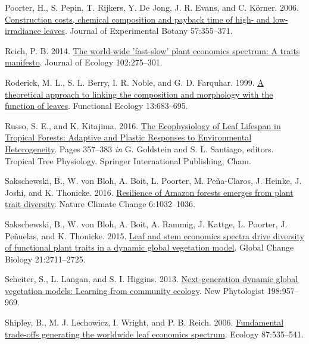 \documentclass[
  12pt,
  a4paper,
,tablecaptionabove
]{scrartcl}
\newlength{\cslhangindent}
\newenvironment{CSLReferences}[2] %
 {%
  \setlength{\parindent}{0pt}
  \ifodd #1 \everypar{\setlength{\hangindent}{\cslhangindent}}\ignorespaces\fi
  \ifnum #2 > 0
  \setlength{\parskip}{#2\baselineskip}
  \fi
 }%
 {}
\begin{document}
\begin{CSLReferences}{1}{0}
\leavevmode{}%
Poorter, H., S. Pepin, T. Rijkers, Y. De Jong, J. R. Evans, and C.
Körner. 2006. \href{https://doi.org/10.1093/jxb/erj002}{Construction
costs, chemical composition and payback time of high- and low-irradiance
leaves}. Journal of Experimental Botany 57:355--371.

\leavevmode{}%
Reich, P. B. 2014. \href{https://doi.org/10.1111/1365-2745.12211}{The
world-wide 'fast-slow' plant economics spectrum: {A} traits manifesto}.
Journal of Ecology 102:275--301.

\leavevmode{}%
Roderick, M. L., S. L. Berry, I. R. Noble, and G. D. Farquhar. 1999.
\href{https://doi.org/10.1046/j.1365-2435.1999.00368.x}{A theoretical
approach to linking the composition and morphology with the function of
leaves}. Functional Ecology 13:683--695.

\leavevmode{}%
Russo, S. E., and K. Kitajima. 2016.
\href{https://doi.org/10.1007/978-3-319-27422-5_17}{The {Ecophysiology}
of {Leaf Lifespan} in {Tropical Forests}: {Adaptive} and {Plastic
Responses} to {Environmental Heterogeneity}}. Pages 357--383 \emph{in}
G. Goldstein and S. L. Santiago, editors. Tropical {Tree Physiology}.
{Springer International Publishing}, {Cham}.

\leavevmode{}%
Sakschewski, B., W. von Bloh, A. Boit, L. Poorter, M. Peña-Claros, J.
Heinke, J. Joshi, and K. Thonicke. 2016.
\href{https://doi.org/10.1038/nclimate3109}{Resilience of {Amazon}
forests emerges from plant trait diversity}. Nature Climate Change
6:1032--1036.

\leavevmode{}%
Sakschewski, B., W. von Bloh, A. Boit, A. Rammig, J. Kattge, L. Poorter,
J. Peñuelas, and K. Thonicke. 2015.
\href{https://doi.org/10.1111/gcb.12870}{Leaf and stem economics spectra
drive diversity of functional plant traits in a dynamic global
vegetation model}. Global Change Biology 21:2711--2725.

\leavevmode{}%
Scheiter, S., L. Langan, and S. I. Higgins. 2013.
\href{https://doi.org/10.1111/nph.12210}{Next-generation dynamic global
vegetation models: {Learning} from community ecology}. New Phytologist
198:957--969.

\leavevmode{}%
Shipley, B., M. J. Lechowicz, I. Wright, and P. B. Reich. 2006.
\href{https://doi.org/10.1890/05-1051}{Fundamental trade-offs generating
the worldwide leaf economics spectrum}. Ecology 87:535--541.


\end{CSLReferences}
\end{document}
